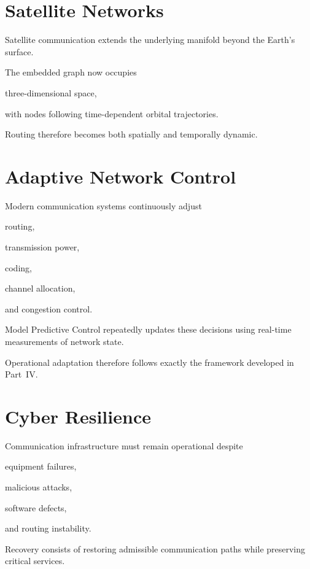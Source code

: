 \documentclass[11pt,fleqn]{book}
\numberwithin{equation}{chapter}
\theoremstyle{plain}
\theoremstyle{definition}
\theoremstyle{remark}
\begin{document}

\section{Satellite Networks}

Satellite communication extends the underlying manifold beyond the
Earth's surface.

The embedded graph now occupies

three-dimensional space,

with nodes following time-dependent orbital trajectories.

Routing therefore becomes both spatially and temporally dynamic.


\section{Adaptive Network Control}

Modern communication systems continuously adjust

routing,

transmission power,

coding,

channel allocation,

and congestion control.

Model Predictive Control repeatedly updates these decisions using
real-time measurements of network state.

Operational adaptation therefore follows exactly the framework developed
in Part~IV.


\section{Cyber Resilience}

Communication infrastructure must remain operational despite

equipment failures,

malicious attacks,

software defects,

and routing instability.

Recovery consists of restoring admissible communication paths while
preserving critical services.
\end{document}
